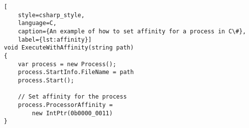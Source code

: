 \begin{lstlisting}[
    style=csharp_style,
    language=C, 
    caption={An example of how to set affinity for a process in C\#},
    label={lst:affinity}]
void ExecuteWithAffinity(string path)
{
    var process = new Process();
    process.StartInfo.FileName = path
    process.Start();
    
    // Set affinity for the process
    process.ProcessorAffinity = 
        new IntPtr(0b0000_0011)
}
\end{lstlisting}